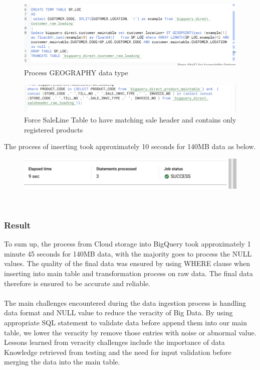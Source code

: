 \begin{figure}[htp]
    \centering
    \includegraphics[width=0.75\linewidth]{images/process data.png}
    \caption{Process GEOGRAPHY data type}
\end{figure}
\begin{figure}[htp]
    \centering
    \includegraphics[width=0.75\linewidth]{images/foreign key.png}
    \caption{Force SaleLine Table to have matching sale header and contains only registered products}
    \label{fig:enter-label}
\end{figure}

The process of inserting took approximately 10 seconds for 140MB data as below. 
\begin{figure}[!htp]
    \centering
    \includegraphics[width=0.75\linewidth]{images/inserttime.png}
\end{figure}
\\
\subsubsection{Result}
    To sum up, the process from Cloud storage into BigQuery took approximately 1 minute 45 seconds for 140MB data, with the majority goes to process the NULL values. The quality of the final data was ensured by using WHERE clause when inserting into main table and transformation process on raw data. The final data therefore is ensured to be accurate  and reliable.
    \\\\
    The main challenges encountered during the data ingestion process is handling data format and NULL value to reduce the veracity of Big Data. By using appropriate SQL statement to validate data before append them into our main table, we lower the veracity by remove those entries with noise or abnormal value. Lessons learned from veracity challenges include the importance of data Knowledge retrieved from testing and the need for input validation before merging the data into the main table.
